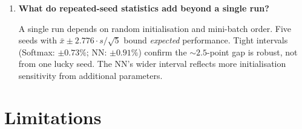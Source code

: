 \documentclass[11pt]{article}
\begin{document}
\begin{enumerate}[leftmargin=2em,itemsep=0.5em]
The $H{=}2$ bottleneck teaches that \emph{capacity is a prerequisite optimisation cannot
substitute}.  Identical optimiser settings yield $58.97\%$ ($H{=}2$) versus $95.71\%$
($H{=}32$).  This distinguishes three failure modes:
\begin{itemize}[leftmargin=1.4em,itemsep=0.1em]
  \item \emph{Optimisation failure}: architecture can represent a solution, optimiser can't
        find it.
  \item \emph{Capacity failure}: architecture \emph{cannot} represent a solution.  $\leftarrow$ this case.
  \item \emph{Generalisation failure}: model fits training but not test data.
\end{itemize}
The $H{=}2$ case is pure capacity failure: increasing $H$ expands the hypothesis class,
not the optimiser.

\item \textbf{What do repeated-seed statistics add beyond a single run?}

A single run depends on random initialisation and mini-batch order.  Five seeds with
$\bar{x}\pm 2.776 \cdot s/\!\sqrt{5}$ bound \emph{expected} performance.  Tight intervals
(Softmax: $\pm 0.73\%$; NN: $\pm 0.91\%$) confirm the ${\sim}2.5$-point gap is robust,
not from one lucky seed.  The NN's wider interval reflects more initialisation sensitivity
from additional parameters.

\end{enumerate}

\section{Limitations}
\label{sec:limitations}
\end{document}
